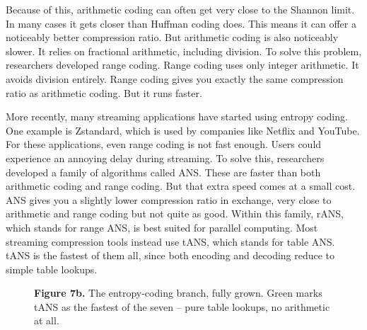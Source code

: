 \documentclass[11pt]{article}
\begin{document}
Because of this, arithmetic coding can often get very close to the Shannon
limit. In many cases it gets closer than Huffman coding does. This means it
can offer a noticeably better compression ratio. But arithmetic coding is
also noticeably slower. It relies on fractional arithmetic, including
division. To solve this problem, researchers developed range coding. Range
coding uses only integer arithmetic. It avoids division entirely. Range
coding gives you exactly the same compression ratio as arithmetic coding.
But it runs faster.

More recently, many streaming applications have started using entropy
coding. One example is Zstandard, which is used by companies like Netflix and
YouTube. For these applications, even range coding is not fast enough. Users
could experience an annoying delay during streaming. To solve this,
researchers developed a family of algorithms called ANS. These are faster
than both arithmetic coding and range coding. But that extra speed comes at a
small cost. ANS gives you a slightly lower compression ratio in exchange,
very close to arithmetic and range coding but not quite as good. Within this
family, rANS, which stands for range ANS, is best suited for parallel
computing. Most streaming compression tools instead use tANS, which stands
for table ANS. tANS is the fastest of them all, since both encoding and
decoding reduce to simple table lookups.

\begin{figure}[H]
\centering
{}
\caption*{\textbf{Figure 7b.} The entropy-coding branch, fully grown. Green
marks tANS as the fastest of the seven -- pure table lookups, no arithmetic at
all.}
\end{figure}
\end{document}
